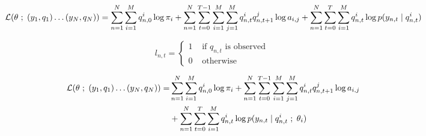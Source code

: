 \documentclass[a4paper, 11pt]{article}
\newcommand{\ssemi}{\hspace{.3em};\hspace{.3em}}
\begin{document}
\begin{displaymath}
  \mathcal{L}(\theta \ssemi (y_1, q_1) \dots (y_N, q_N) ) = \sum_{n = 1}^N \sum_{i = 1}^{M} q_{n, 0}^i \log{\pi_i} + \sum_{n = 1}^N \sum_{t = 0}^{T-1} \sum_{i = 1}^{M} \sum_{j = 1}^{M} q_{n, t}^i q_{n, t+1}^j \log{a_{i,j}} + \sum_{n = 1}^N \sum_{t = 0}^{T} \sum_{i = 1}^{M} q_{n, t}^i \log{ p(y_{n, t} \mid q_{n, t}^i) }
\end{displaymath}




\begin{displaymath}
  l_{n, t} = \left\{
    \begin{array}{ll}
      1 &\text{ if $q_{n, t}$ is observed } \\
      0 &\text{ otherwise }
    \end{array}
    \right.
\end{displaymath}



\begin{displaymath}
  \begin{split}
    \mathcal{L}(\theta \ssemi (y_1, q_1) \dots (y_N, q_N) )
    = &\sum_{n = 1}^N \sum_{i = 1}^{M} q_{n, 0}^i \log{\pi_i}
    + \sum_{n = 1}^N \sum_{t = 0}^{T-1} \sum_{i = 1}^{M} \sum_{j = 1}^{M} q_{n, t}^i q_{n, t+1}^j \log{a_{i,j}} \\
    & + \sum_{n = 1}^N \sum_{t = 0}^{T} \sum_{i = 1}^{M} q_{n, t}^i \log{ p(y_{n, t} \mid q_{n, t}^i \ssemi \theta_i) }
  \end{split}
\end{displaymath}
\end{document}
